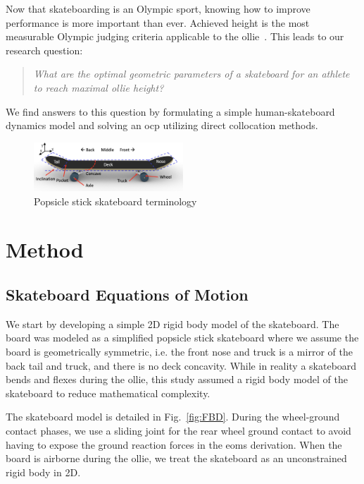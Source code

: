 \documentclass[default,iicol]{sn-jnl}
\begin{document}
Now that skateboarding is an Olympic sport, knowing how to improve performance is more important than ever.
Achieved height is the most measurable Olympic judging criteria applicable to the ollie~\cite{world_skate_skateboarding_2021}.
This leads to our research question:
\begin{quote}
\textit{
    What are the optimal geometric parameters of a skateboard for an athlete to reach maximal ollie height?}
\end{quote}
We find answers to this question by formulating a simple human-skateboard dynamics model and solving an \gls{ocp} utilizing direct collocation methods.

\begin{figure}[t]
    \includegraphics[width=0.5\textwidth]{figure/Fig2.png}
    \caption[Skateboard terminology]{Popsicle stick skateboard terminology}
    \label{fig:skateboard terminology}
\end{figure}

\section{Method}

\subsection{Skateboard Equations of Motion}
We start by developing a simple 2D rigid body model of the skateboard.
The board was modeled as a simplified popsicle stick skateboard where we assume the board is geometrically symmetric, i.e. the front nose and truck is a mirror of the back tail and truck, and there is no deck concavity.
While in reality a skateboard bends and flexes during the ollie, this study assumed a rigid body model of the skateboard to reduce mathematical complexity.

The skateboard model is detailed in Fig.~\ref{fig:FBD}. During the wheel-ground contact phases, we use a sliding joint for the rear wheel ground contact to avoid having to expose the ground reaction forces in the \glspl{eom} derivation.
When the board is airborne during the ollie, we treat the skateboard as an unconstrained rigid body in 2D. 
\end{document}
